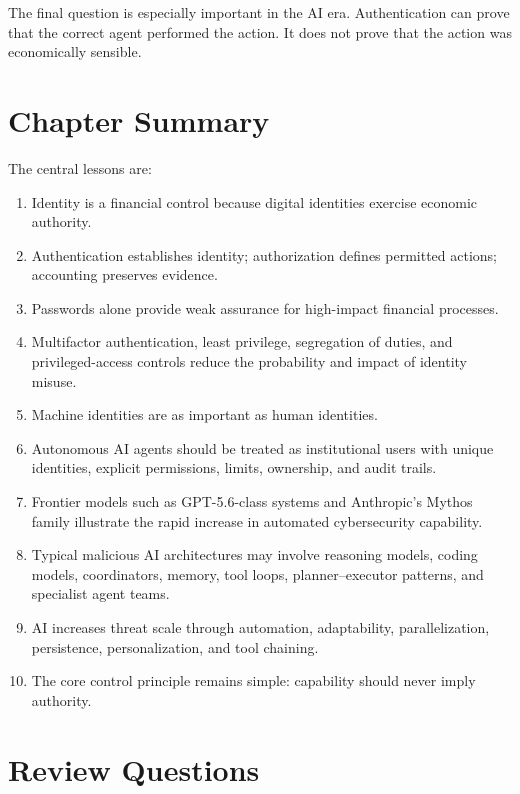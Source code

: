 The final question is especially important in the AI era. Authentication can prove that the correct agent performed the action. It does not prove that the action was economically sensible.

\section{Chapter Summary}

The central lessons are:

\begin{enumerate}
    \item Identity is a financial control because digital identities exercise economic authority.
    \item Authentication establishes identity; authorization defines permitted actions; accounting preserves evidence.
    \item Passwords alone provide weak assurance for high-impact financial processes.
    \item Multifactor authentication, least privilege, segregation of duties, and privileged-access controls reduce the probability and impact of identity misuse.
    \item Machine identities are as important as human identities.
    \item Autonomous AI agents should be treated as institutional users with unique identities, explicit permissions, limits, ownership, and audit trails.
    \item Frontier models such as GPT-5.6-class systems and Anthropic's Mythos family illustrate the rapid increase in automated cybersecurity capability.
    \item Typical malicious AI architectures may involve reasoning models, coding models, coordinators, memory, tool loops, planner--executor patterns, and specialist agent teams.
    \item AI increases threat scale through automation, adaptability, parallelization, persistence, personalization, and tool chaining.
    \item The core control principle remains simple: capability should never imply authority.
\end{enumerate}

\section{Review Questions}

